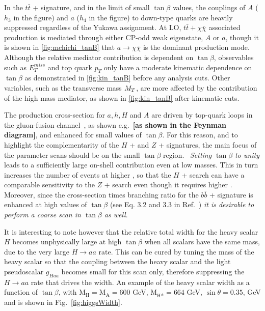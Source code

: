 In the $t\bar{t}$ + \MET signature, and in the limit of small $\tan\beta$ values, the couplings of $A$ ($h_{3}$ in the figure) and $a$ ($h_{4}$ in the figure) to down-type quarks are heavily suppressed regardless of the Yukawa assignment. At LO, $t\bar{t}+\chi\bar{\chi}$ associated production is mediated through either CP-odd weak eigenstate, $A$ or $a$, though it is shown in \autoref{fig:mchichi_tanB} that $a\rightarrow\chi\bar{\chi}$ is the dominant production mode. 
Although the relative mediator contribution is dependent on $\tan\beta$, observables such as $E_{T}^{miss}$ and top quark $p_{T}$ only have a moderate kinematic dependence on $\tan\beta$ as demonstrated in \autoref{fig:kin_tanB} before any analysis cuts. 
Other variables, such as the transverse mass $M_{T}$, are more affected by the contribution of the high mass mediator, as shown in \autoref{fig:kin_tanB} after kinematic cuts. 

The production cross-section for $a, h, H$ and $A$ are driven by top-quark loops in the gluon-fusion channel~\cite{Haisch:2012kf}, as shown e.g.~\textbf{[as shown in the Feynman diagram]}, and enhanced for small values of $\tan\beta$. For this reason, and to highlight the complementarity of the $H$ + \MET and $Z$ + \MET signatures, the main focus of the parameter scans should be on the small $\tan\beta$ region. ~\textit{Setting $\tan\beta$ to unity} leads to a sufficiently large on-shell contribution even at low masses. This in turn increases the number of events at higher \MET, so that the $H$ + \MET search can have a comparable sensitivity to the $Z$ + \MET search even though it requires higher \MET. 
Moreover, since the cross-section times branching ratio for the $b\bar{b}$ + \MET signature is enhanced at high values of $\tan\beta$ (see Eq. 3.2 and 3.3 in Ref.~\cite{Bauer:2017ota}) \emph{it is desirable to perform a coarse scan in $\tan\beta$ as well}. 

It is interesting to note however that the relative total width for the heavy scalar $H$ becomes unphysically large at high $\tan\beta$ when all scalars have the same mass, due to the very large $H\rightarrow aa$ rate. 
This can be cured by tuning the mass of the heavy scalar so that the coupling between the heavy scalar and the light pseudoscalar $g_{Haa}$ becomes small for this scan only, therefore suppressing the $H\rightarrow aa$ rate that drives the width. An example of the heavy scalar width as a function of $\tan\beta$, with $\mathrm{M_H}=\mathrm{M_A}=600$ GeV, $\mathrm{M_{H^{\pm}}}=664$ GeV, $\sin\theta=0.35$,  GeV and  is shown in Fig.~\ref{fig:higgsWidth}. 

